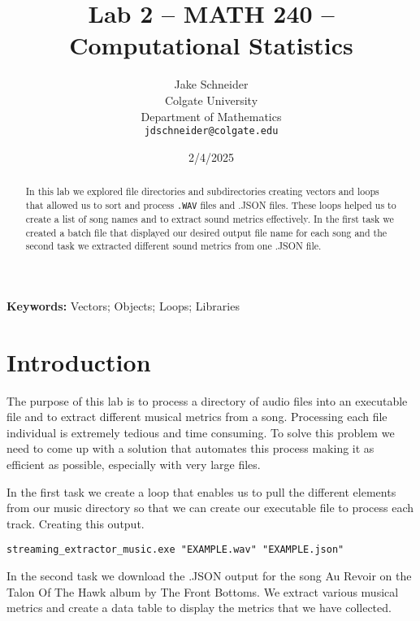 \documentclass{article}\usepackage[]{graphicx}\usepackage[]{xcolor}
\begin{document}
\vspace{-1in}
\title{Lab 2 -- MATH 240 -- Computational Statistics}

\author{
  Jake Schneider \\
  Colgate University  \\
  Department of Mathematics  \\
  {\tt jdschneider@colgate.edu}
}

\date{2/4/2025}

\maketitle

\begin{multicols}{2}
\begin{abstract}
In this lab we explored file directories and subdirectories creating vectors and loops that allowed us to sort and process {\tt{.WAV}} files and .JSON files. These loops helped us to create a list of song names and to extract sound metrics effectively. In the first task we created a batch file that displayed our desired output file name for each song and the second task we extracted different sound metrics from one .JSON file. 
\end{abstract}

\noindent \textbf{Keywords:} Vectors; Objects; Loops; Libraries

\section{Introduction}
The purpose of this lab is to process a directory of audio files into an executable file and to extract different musical metrics from a song. Processing each file individual is extremely tedious and time consuming. To solve this problem we need to come up with a solution that automates this process making it as efficient as possible, especially with very large files. 

In the first task we create a loop that enables us to pull the different elements from our music directory so that we can create our executable file to process each track. Creating this output. 
\begin{center}
\texttt{streaming\_extractor\_music.exe "EXAMPLE.wav" "EXAMPLE.json"}
\end{center}

In the second task we download the .JSON output for the song Au Revoir on the Talon Of The Hawk album by The Front Bottoms. We extract various musical metrics and create a data table to display the metrics that we have collected.  




\end{multicols}
\end{document}
